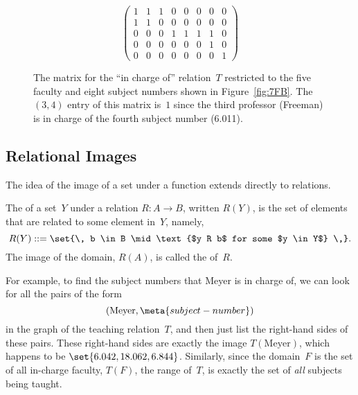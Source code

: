 \begin{figure}

\begin{equation*}
\begin{pmatrix}
    1 & 1 & 1 & 0 & 0 & 0 & 0 & 0 \\
    1 & 1 & 0 & 0 & 0 & 0 & 0 & 0 \\
    0 & 0 & 0 & 1 & 1 & 1 & 1 & 0 \\
    0 & 0 & 0 & 0 & 0 & 0 & 1 & 0 \\
    0 & 0 & 0 & 0 & 0 & 0 & 0 & 1
\end{pmatrix}
\end{equation*}

\caption{The matrix for the ``in charge of'' relation~$T$ restricted
  to the five faculty and eight subject numbers shown in
  Figure~\ref{fig:7FB}.  The $(3,4)$ entry of this matrix is~$1$ since
  the third professor (Freeman) is in charge of the fourth subject
  number (6.011).}

\label{fig:7FC}

\end{figure}

\subsection{Relational Images}

The idea of the image of a set under a function extends directly to
relations.

\begin{definition}
The  of a set~$Y$ under a relation $R: A \to B$, written
$R(Y)$, is the set of elements that are related to some element
in~$Y$, namely,
\begin{equation*}
    R(Y) ::= \set{\, b \in B \mid \text{$y R b$ for some $y \in Y$} \,}.
\end{equation*}
The image of the domain, $R(A)$, is called the  of~$R$.
\end{definition}

For example, to find the subject numbers that Meyer is in charge of,
we can look for all the pairs of the form
\begin{equation*}
    (\text{Meyer}, \meta{subject-number})
\end{equation*}
in the graph of the teaching relation~$T$, and then just list the
right-hand sides of these pairs.  These right-hand sides are exactly
the image $T(\text{Meyer})$, which happens to be $\set{6.042, 18.062,
  6.844}$.  Similarly, since the domain~$F$ is the set of all
in-charge faculty, $T(F)$, the range of~$T$, is exactly the set of
\emph{all} subjects being taught.

